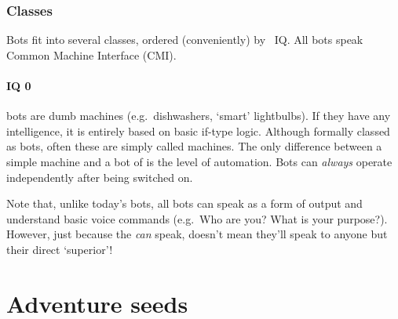 \documentclass[a4paper,twocolumn]{memoir}
\begin{document}
\subsection{Classes}
\label{sec:classes}

Bots fit into several classes, ordered (conveniently) by \gurps~IQ. All bots
speak Common Machine Interface (CMI).

\subsubsection{IQ 0}
\label{sec:iq-0-3}

 bots are dumb machines (e.g.~dishwashers, `smart' lightbulbs). If they
have any intelligence, it is entirely based on basic if-type logic. Although
formally classed as bots, often these are simply called machines. The only
difference between a simple machine and a bot of  is the level of
automation. Bots can \emph{always} operate independently after being switched
on.

Note that, unlike today's bots, all bots can speak as a form of output and
understand basic voice commands (e.g.~Who are you? What is your purpose?).
However, just because the \emph{can} speak, doesn't mean they'll speak to anyone
but their direct `superior'!


\chapter{Adventure seeds}
\end{document}
